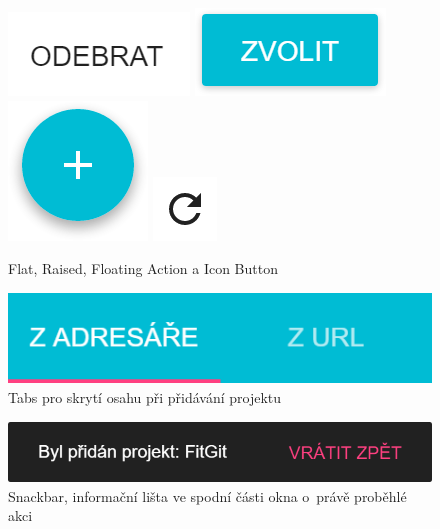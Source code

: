 \begin{figure}[ht]
	\mbox{\includegraphics[scale=0.5]{sections/ui/images/Button-Flat.png}}   
	\hspace{12px}
	\mbox{\includegraphics[scale=0.5]{sections/ui/images/Button-Raised.png}}
	\hspace{12px}
	\mbox{\includegraphics[scale=0.5]{sections/ui/images/Button-Floating.png}}
	\hspace{12px}
	\mbox{\includegraphics[scale=0.5]{sections/ui/images/Button-Icon.png}}
	\caption[Button]{Flat, Raised, Floating Action a Icon Button}
	\label{fig:buttons}
\end{figure}

\begin{figure}[ht]
\centering
\includegraphics[scale=0.5]{sections/ui/images/Tabs.png}
\caption[Tabs]{Tabs pro skrytí osahu při přidávání projektu}
\label{fig:tabs}
\end{figure}

\begin{figure}[ht]
\centering
\includegraphics[scale=0.5]{sections/ui/images/Snackbar.png}
\caption[Snackbar]{Snackbar, informační lišta ve spodní části okna o~právě proběhlé akci}
\label{fig:snackbar}
\end{figure}

